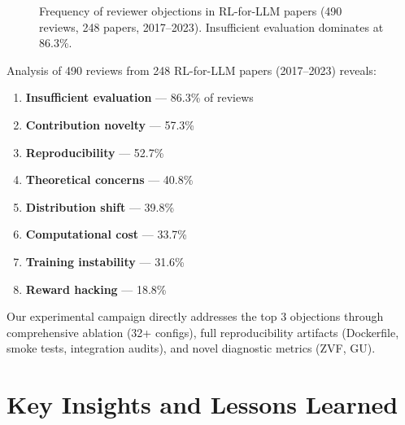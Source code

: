 \documentclass[12pt,a4paper]{report}
\theoremstyle{definition}
\begin{document}
\begin{figure}[htbp]
\centering
{}
\caption{Frequency of reviewer objections in RL-for-LLM papers (490 reviews, 248 papers, 2017--2023).
Insufficient evaluation dominates at 86.3\%.}
\label{fig:reviewer-objections}
\end{figure}

Analysis of 490 reviews from 248 RL-for-LLM papers (2017--2023) reveals:

\begin{enumerate}[nosep]
\item \textbf{Insufficient evaluation} --- 86.3\% of reviews
\item \textbf{Contribution novelty} --- 57.3\%
\item \textbf{Reproducibility} --- 52.7\%
\item \textbf{Theoretical concerns} --- 40.8\%
\item \textbf{Distribution shift} --- 39.8\%
\item \textbf{Computational cost} --- 33.7\%
\item \textbf{Training instability} --- 31.6\%
\item \textbf{Reward hacking} --- 18.8\%
\end{enumerate}

Our experimental campaign directly addresses the top 3 objections through comprehensive ablation (32+ configs),
full reproducibility artifacts (Dockerfile, smoke tests, integration audits), and novel diagnostic metrics (ZVF, GU).




\chapter{Key Insights and Lessons Learned}
\label{ch:insights}
\end{document}
